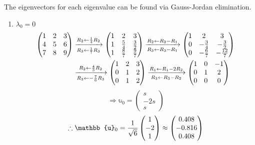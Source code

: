The eigenvectors for each eigenvalue can be found via Gauss-Jordan elimination.
\begin{enumerate}[wide, labelindent = 0pt, label = (\roman*)]
\item $\lambda_0 = 0$
\begin{align*}
    \begin{pmatrix}
        1 & 2 & 3 \\
        4 & 5 & 6 \\
        7 & 8 & 9
    \end{pmatrix}
    &\xrightarrow[R_3 \leftarrow \frac{1}{7} R_3]{R_2 \leftarrow \frac{1}{4} R_2} \begin{pmatrix}
        1 & 2           & 3           \\
        1 & \frac{5}{4} & \frac{3}{2} \\
        1 & \frac{8}{7} & \frac{9}{7}
    \end{pmatrix}
    \xrightarrow[R_3 \leftarrow R_3 - R_1]{R_2 \leftarrow R_2 - R_1} \begin{pmatrix}
        1 & 2            & 3            \\
        0 & -\frac{3}{4} & -\frac{3}{2} \\
        0 & -\frac{6}{7} & -\frac{12}{7}
    \end{pmatrix} \\
    &\xrightarrow[R_3 \leftarrow -\frac{7}{6} R_3]{R_2 \leftarrow \frac{4}{3} R_2} \begin{pmatrix}
        1 & 2 & 3 \\
        0 & 1 & 2 \\
        0 & 1 & 2
    \end{pmatrix}
    \xrightarrow[R_3 \leftarrow R_3 - R_2]{R_1 \leftarrow R_1 - 2R_2} \begin{pmatrix}
        1 & 0 & -1 \\
        0 & 1 & 2  \\
        0 & 0 & 0
    \end{pmatrix}
\end{align*}
\[
    \Rightarrow \mathbb{u}_0 = \begin{pmatrix}
        s \\ -2s \\ s
    \end{pmatrix}
\]
\[
    \therefore \mathbb{u}_0 = \inv{\sqrt{6}} \begin{pmatrix}
        1 \\ -2 \\ 1
    \end{pmatrix}
    \approx \begin{pmatrix}
        0.408 \\ -0.816 \\ 0.408
    \end{pmatrix}
\]


\end{enumerate}
